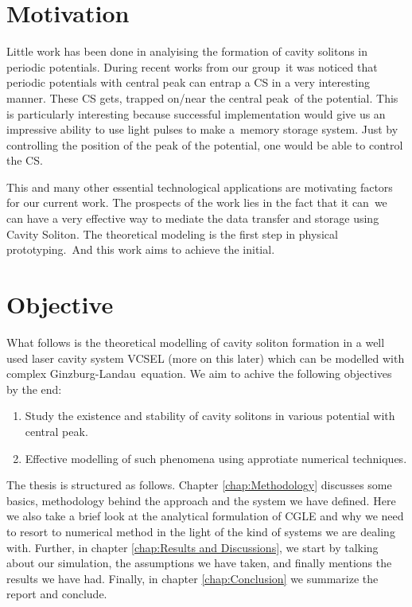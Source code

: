 \section{Motivation}

Little work has been done in analyising the formation of cavity solitons in periodic potentials. During recent works from our group\
it was noticed that periodic potentials with central peak can entrap a CS in a very interesting manner. These CS gets, trapped on/near the central peak\
of the potential. This is particularly interesting because successful implementation would give us an impressive ability to use light pulses to make a\
memory storage system. Just by controlling the position of the peak of the potential, one would be able to control the CS.  

This and many other essential technological applications are motivating factors for our current work. The prospects of the work lies in the fact that it can\
we can have a very effective way to mediate the data transfer and storage using Cavity Soliton. The theoretical modeling is the first step in physical prototyping.\
And this work aims to achieve the initial.

\section{Objective}
What follows is the theoretical modelling of cavity soliton formation in a well used laser cavity system VCSEL (more on this later) which can be modelled with complex Ginzburg-Landau\
equation. We aim to achive the following objectives by the end:
\begin{enumerate}
    \item Study the existence and stability of cavity solitons in various potential with central peak.
    \item Effective modelling of such phenomena using approtiate numerical techniques. 
\end{enumerate} 



The thesis is structured as follows. Chapter \ref{chap:Methodology} discusses some basics, methodology behind the approach and the system we have defined. 
Here we also take a brief look at the analytical formulation of CGLE and why we need to resort to numerical method in the light 
of the kind of systems we are dealing with. Further, in chapter \ref{chap:Results and Discussions}, we start by talking about our simulation, the assumptions we
have taken, and finally mentions the results we have had. Finally, in chapter \ref{chap:Conclusion} we summarize the report and conclude.  